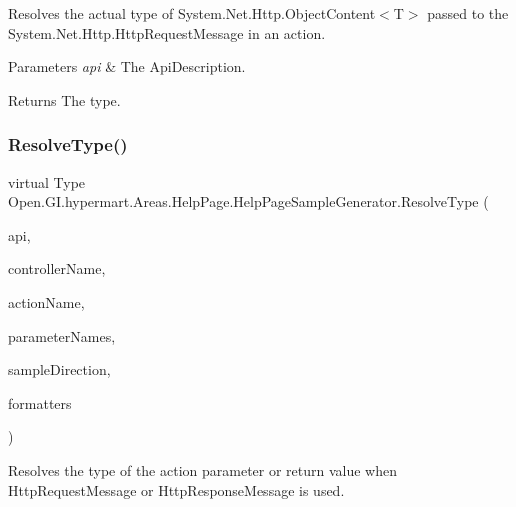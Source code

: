 Resolves the actual type of System.\+Net.\+Http.\+Object\+Content$<$\+T$>$ passed to the System.\+Net.\+Http.\+Http\+Request\+Message in an action. 


\begin{DoxyParams}{Parameters}
{\em api} & The Api\+Description.\\
\hline
\end{DoxyParams}
\begin{DoxyReturn}{Returns}
The type.
\end{DoxyReturn}
\hypertarget{class_open_1_1_g_i_1_1hypermart_1_1_areas_1_1_help_page_1_1_help_page_sample_generator_aa2027a7a15a18958eb23c9a9d2407cda}{}\label{class_open_1_1_g_i_1_1hypermart_1_1_areas_1_1_help_page_1_1_help_page_sample_generator_aa2027a7a15a18958eb23c9a9d2407cda} 
\subsubsection{\texorpdfstring{Resolve\+Type()}{ResolveType()}}
{\footnotesize\ttfamily virtual Type Open.\+G\+I.\+hypermart.\+Areas.\+Help\+Page.\+Help\+Page\+Sample\+Generator.\+Resolve\+Type (\begin{DoxyParamCaption}\item[{Api\+Description}]{api,  }\item[{string}]{controller\+Name,  }\item[{string}]{action\+Name,  }\item[{I\+Enumerable$<$ string $>$}]{parameter\+Names,  }\item[{\hyperlink{namespace_open_1_1_g_i_1_1hypermart_1_1_areas_1_1_help_page_a96790152101b7f9c7e4ff518bb45c822}{Sample\+Direction}}]{sample\+Direction,  }\item[{out Collection$<$ Media\+Type\+Formatter $>$}]{formatters }\end{DoxyParamCaption})\hspace{0.3cm}{\ttfamily [virtual]}}



Resolves the type of the action parameter or return value when Http\+Request\+Message or Http\+Response\+Message is used. 


